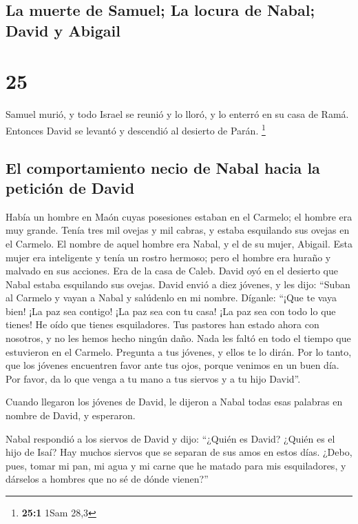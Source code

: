 \begin{paracol}{2}
{\subsection{La muerte de Samuel; La locura de Nabal; David y
Abigail}\label{la-muerte-de-samuel-la-locura-de-nabal-david-y-abigail}}

\hypertarget{section-48}{%
\section{25}\label{section-48}}

 Samuel murió, y todo Israel se reunió y lo lloró, y lo
enterró en su casa de Ramá. Entonces David se levantó y descendió al
desierto de Parán. \footnote{\textbf{25:1} 1Sam 28,3}

\hypertarget{el-comportamiento-necio-de-nabal-hacia-la-peticiuxf3n-de-david}{%
\subsection{El comportamiento necio de Nabal hacia la petición de
David}\label{el-comportamiento-necio-de-nabal-hacia-la-peticiuxf3n-de-david}}

 Había un hombre en Maón cuyas posesiones estaban en el
Carmelo; el hombre era muy grande. Tenía tres mil ovejas y mil cabras, y
estaba esquilando sus ovejas en el Carmelo.  El nombre de
aquel hombre era Nabal, y el de su mujer, Abigail. Esta mujer era
inteligente y tenía un rostro hermoso; pero el hombre era huraño y
malvado en sus acciones. Era de la casa de Caleb.  David
oyó en el desierto que Nabal estaba esquilando sus ovejas.
 David envió a diez jóvenes, y les dijo: ``Suban al
Carmelo y vayan a Nabal y salúdenlo en mi nombre. 
Díganle: ``¡Que te vaya bien! ¡La paz sea contigo! ¡La paz sea con tu
casa! ¡La paz sea con todo lo que tienes!  He oído que
tienes esquiladores. Tus pastores han estado ahora con nosotros, y no
les hemos hecho ningún daño. Nada les faltó en todo el tiempo que
estuvieron en el Carmelo.  Pregunta a tus jóvenes, y ellos
te lo dirán. Por lo tanto, que los jóvenes encuentren favor ante tus
ojos, porque venimos en un buen día. Por favor, da lo que venga a tu
mano a tus siervos y a tu hijo David''.

 Cuando llegaron los jóvenes de David, le dijeron a Nabal
todas esas palabras en nombre de David, y esperaron.

 Nabal respondió a los siervos de David y dijo: ``¿Quién
es David? ¿Quién es el hijo de Isaí? Hay muchos siervos que se separan
de sus amos en estos días.  ¿Debo, pues, tomar mi pan, mi
agua y mi carne que he matado para mis esquiladores, y dárselos a
hombres que no sé de dónde vienen?''


\end{paracol}
